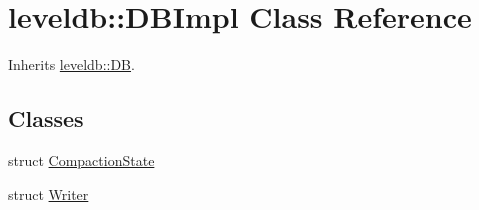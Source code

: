 \hypertarget{classleveldb_1_1_d_b_impl}{}\section{leveldb\+::D\+B\+Impl Class Reference}
\label{classleveldb_1_1_d_b_impl}


Inherits \mbox{\hyperlink{classleveldb_1_1_d_b}{leveldb\+::\+DB}}.

\subsection*{Classes}
\begin{DoxyCompactItemize}
\item 
struct \mbox{\hyperlink{structleveldb_1_1_d_b_impl_1_1_compaction_state}{Compaction\+State}}
\item 
struct \mbox{\hyperlink{structleveldb_1_1_d_b_impl_1_1_writer}{Writer}}
\end{DoxyCompactItemize}
